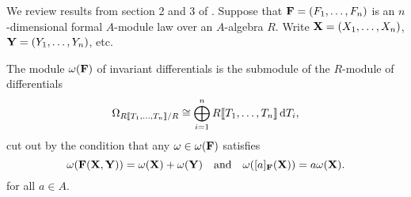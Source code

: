 
We review results from section
2 and 3 of \cite{hopkins1994equivariant}. 
Suppose that $\mathbf{F} = (F_1, \dots, F_n)$ is an $n$-dimensional formal $A$-module law over an
$A$-algebra $R$. Write $\mathbf{X} = (X_1, \dots, X_n)$, $\mathbf{Y} = (Y_1, \dots, Y_n)$, etc.

\begin{defi}
  The module $\omega(\mathbf{F})$ of invariant differentials is the submodule of the
  $R$-module of differentials
  \begin{equation*}
    \Omega_{R\llbracket T_1, \dots, T_n \rrbracket/R} \cong \bigoplus_{i=1}^n R\llbracket T_1, \dots, T_n
    \rrbracket \, \mathrm{d} T_i,
  \end{equation*}
  cut out by the condition that any $\omega \in \omega(\mathbf{F})$ satisfies
  \begin{equation}\label{eq:diffcond}
    \omega(\mathbf{F}(\mathbf{X},\mathbf{Y})) = \omega(\mathbf{X}) + \omega(\mathbf{Y})\quad \text{and} \quad
    \omega([a]_{\mathbf{F}}(\mathbf{X})) = a\omega(\mathbf{X}).
  \end{equation} 
  for all $a \in A$. 
\end{defi}

